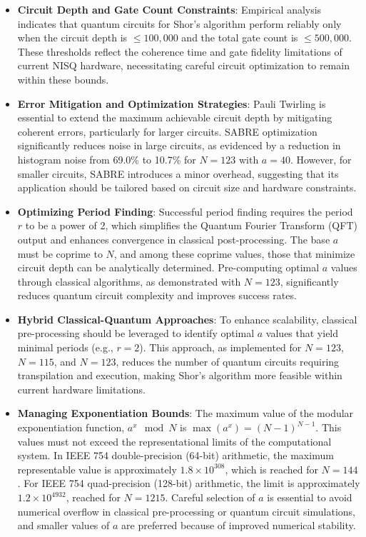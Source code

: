 \documentclass[conference,twoside]{IEEEtran}
\begin{document}
\begin{itemize}
    \item \textbf{Circuit Depth and Gate Count Constraints}: Empirical analysis indicates that quantum circuits for Shor's algorithm perform reliably only when the circuit depth is $\leq 100,000$ and the total gate count is $\leq 500,000$. These thresholds reflect the coherence time and gate fidelity limitations of current NISQ hardware, necessitating careful circuit optimization to remain within these bounds.
    
    \item \textbf{Error Mitigation and Optimization Strategies}: Pauli Twirling is essential to extend the maximum achievable circuit depth by mitigating coherent errors, particularly for larger circuits. SABRE optimization significantly reduces noise in large circuits, as evidenced by a reduction in histogram noise from 69.0\% to 10.7\% for $N=123$ with $a=40$. However, for smaller circuits, SABRE introduces a minor overhead, suggesting that its application should be tailored based on circuit size and hardware constraints.
    
    \item \textbf{Optimizing Period Finding}: Successful period finding requires the period $r$ to be a power of 2, which simplifies the Quantum Fourier Transform (QFT) output and enhances convergence in classical post-processing. The base $a$ must be coprime to $N$, and among these coprime values, those that minimize circuit depth can be analytically determined. Pre-computing optimal $a$ values through classical algorithms, as demonstrated with $N=123$, significantly reduces quantum circuit complexity and improves success rates.
    
    \item \textbf{Hybrid Classical-Quantum Approaches}: To enhance scalability, classical pre-processing should be leveraged to identify optimal $a$ values that yield minimal periods (e.g., $r=2$). This approach, as implemented for $N=123$, $N=115$, and $N=123$, reduces the number of quantum circuits requiring transpilation and execution, making Shor's algorithm more feasible within current hardware limitations.
    
    \item \textbf{Managing Exponentiation Bounds}: The maximum value of the modular exponentiation function, $a^x \mod N$ is $\max(a^x) = (N-1)^{N-1}$. This values must not exceed the representational limits of the computational system. In IEEE 754 double-precision (64-bit) arithmetic, the maximum representable value is approximately $1.8 \times 10^{308}$, which is reached for $N=144$. For IEEE 754 quad-precision (128-bit) arithmetic, the limit is approximately $1.2 \times 10^{4932}$, reached for $N=1215$. Careful selection of $a$ is essential to avoid numerical overflow in classical pre-processing or quantum circuit simulations, and smaller values of $a$ are preferred because of improved numerical stability.
    

\end{itemize}
\end{document}
